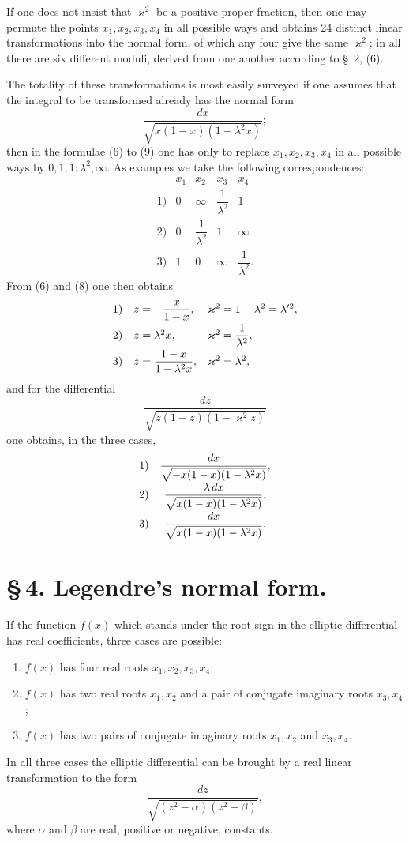 \documentclass[11pt]{article}
\begin{document}
If one does not insist that $\varkappa^2$ be a positive proper fraction, then one may permute the points $x_1,x_2,x_3,x_4$ in all possible ways and obtains 24 distinct linear transformations into the normal form, of which any four give the same $\varkappa^2$; in all there are six different moduli, derived from one another according to \S~2, (6).

The totality of these transformations is most easily surveyed if one assumes that the integral to be transformed already has the normal form
\[
\frac{dx}{\sqrt{x(1-x)(1-\lambda^2x)}};
\]
then in the formulae (6) to (9) one has only to replace $x_1,x_2,x_3,x_4$ in all possible ways by $0,1,1:\lambda^2,\infty$. As examples we take the following correspondences:
\[
\begin{array}{c|cccc}
&x_1&x_2&x_3&x_4\\ \hline
1)&0&\infty&\dfrac{1}{\lambda^2}&1\\[0.5em]
2)&0&\dfrac{1}{\lambda^2}&1&\infty\\[0.5em]
3)&1&0&\infty&\dfrac{1}{\lambda^2}.
\end{array}
\]
From (6) and (8) one then obtains
\[
\begin{array}{r@{\quad}l@{\quad}l}
1)& z=-\dfrac{x}{1-x},& \varkappa^2=1-\lambda^2=\lambda'^2,\\[0.7em]
2)& z=\lambda^2x,& \varkappa^2=\dfrac1{\lambda^2},\\[0.7em]
3)& z=\dfrac{1-x}{1-\lambda^2x},& \varkappa^2=\lambda^2,
\end{array}
\]
and for the differential
\[
\frac{dz}{\sqrt{z(1-z)(1-\varkappa^2z)}}
\]
one obtains, in the three cases,
\[
\begin{array}{r@{\quad}c}
1)& \dfrac{dx}{\sqrt{-x(1-x)(1-\lambda^2x)}},\\[0.9em]
2)& \dfrac{\lambda\,dx}{\sqrt{x(1-x)(1-\lambda^2x)}},\\[0.9em]
3)& \dfrac{dx}{\sqrt{x(1-x)(1-\lambda^2x)}}.
\end{array}
\]

\section*{\S\,4. Legendre's normal form.}

If the function $f(x)$ which stands under the root sign in the elliptic differential has real coefficients, three cases are possible:
\begin{enumerate}[label=\arabic*.]
\item $f(x)$ has four real roots $x_1,x_2,x_3,x_4$;
\item $f(x)$ has two real roots $x_1,x_2$ and a pair of conjugate imaginary roots $x_3,x_4$;
\item $f(x)$ has two pairs of conjugate imaginary roots $x_1,x_2$ and $x_3,x_4$.
\end{enumerate}
In all three cases the elliptic differential can be brought by a real linear transformation to the form
\begin{equation}
\frac{dz}{\sqrt{(z^2-\alpha)(z^2-\beta)}},
\tag{1}
\end{equation}
where $\alpha$ and $\beta$ are real, positive or negative, constants.
\end{document}
